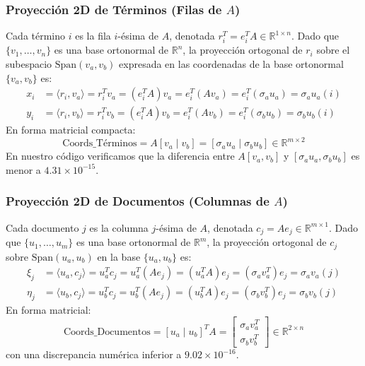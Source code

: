 \documentclass[11pt,a4paper]{article}
\begin{document}
\subsubsection{Proyección 2D de Términos (Filas de $A$)}
Cada término $i$ es la fila $i$-ésima de $A$, denotada $r_i^T = e_i^T A \in \mathbb{R}^{1 \times n}$.
Dado que $\{v_1, \dots, v_n\}$ es una base ortonormal de $\mathbb{R}^n$, la proyección ortogonal de $r_i$ sobre el subespacio $\text{Span}(v_a, v_b)$ expresada en las coordenadas de la base ortonormal $\{v_a, v_b\}$ es:
\begin{align}
    x_i &= \langle r_i, v_a \rangle = r_i^T v_a = (e_i^T A) v_a = e_i^T (A v_a) = e_i^T (\sigma_a u_a) = \sigma_a u_a(i) \\
    y_i &= \langle r_i, v_b \rangle = r_i^T v_b = (e_i^T A) v_b = e_i^T (A v_b) = e_i^T (\sigma_b u_b) = \sigma_b u_b(i)
\end{align}
En forma matricial compacta:
\begin{equation}
    \text{Coords\_Términos} = A [v_a \mid v_b] = [\sigma_a u_a \mid \sigma_b u_b] \in \mathbb{R}^{m \times 2}
\end{equation}
En nuestro código verificamos que la diferencia entre $A [v_a, v_b]$ y $[\sigma_a u_a, \sigma_b u_b]$ es menor a $4.31 \times 10^{-15}$.

\subsubsection{Proyección 2D de Documentos (Columnas de $A$)}
Cada documento $j$ es la columna $j$-ésima de $A$, denotada $c_j = A e_j \in \mathbb{R}^{m \times 1}$.
Dado que $\{u_1, \dots, u_m\}$ es una base ortonormal de $\mathbb{R}^m$, la proyección ortogonal de $c_j$ sobre $\text{Span}(u_a, u_b)$ en la base $\{u_a, u_b\}$ es:
\begin{align}
    \xi_j &= \langle u_a, c_j \rangle = u_a^T c_j = u_a^T (A e_j) = (u_a^T A) e_j = (\sigma_a v_a^T) e_j = \sigma_a v_a(j) \\
    \eta_j &= \langle u_b, c_j \rangle = u_b^T c_j = u_b^T (A e_j) = (u_b^T A) e_j = (\sigma_b v_b^T) e_j = \sigma_b v_b(j)
\end{align}
En forma matricial:
\begin{equation}
    \text{Coords\_Documentos} = [u_a \mid u_b]^T A = \begin{bmatrix} \sigma_a v_a^T \\ \sigma_b v_b^T \end{bmatrix} \in \mathbb{R}^{2 \times n}
\end{equation}
con una discrepancia numérica inferior a $9.02 \times 10^{-16}$.
\end{document}
